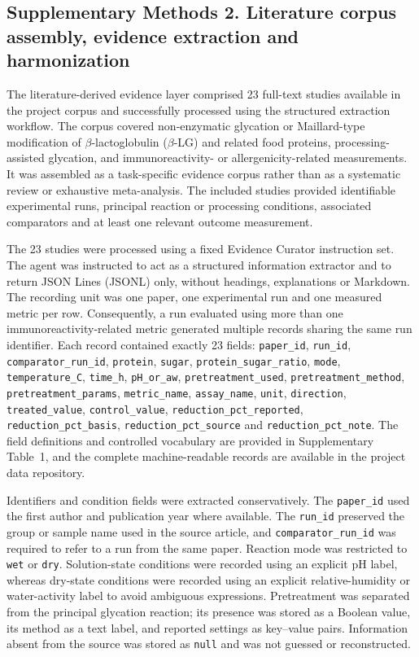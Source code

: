 \subsection*{Supplementary Methods 2. Literature corpus assembly, evidence extraction and harmonization}

The literature-derived evidence layer comprised 23 full-text studies available in
the project corpus and successfully processed using the structured extraction
workflow. The corpus covered non-enzymatic glycation or Maillard-type modification
of $\beta$-lactoglobulin ($\beta$-LG) and related food proteins,
processing-assisted glycation, and immunoreactivity- or allergenicity-related
measurements. It was assembled as a task-specific evidence corpus rather than as a
systematic review or exhaustive meta-analysis. The included studies provided
identifiable experimental runs, principal reaction or processing conditions,
associated comparators and at least one relevant outcome measurement.

The 23 studies were processed using a fixed Evidence Curator instruction
set. The agent was instructed to act as a structured information extractor and to
return JSON Lines (JSONL) only, without headings, explanations or Markdown. The
recording unit was one paper, one experimental run and one measured metric per row.
Consequently, a run evaluated using more than one immunoreactivity-related metric
generated multiple records sharing the same run identifier. Each record contained
exactly 23 fields: \texttt{paper\_id}, \texttt{run\_id},
\texttt{comparator\_run\_id}, \texttt{protein}, \texttt{sugar},
\texttt{protein\_sugar\_ratio}, \texttt{mode}, \texttt{temperature\_C},
\texttt{time\_h}, \texttt{pH\_or\_aw}, \texttt{pretreatment\_used},
\texttt{pretreatment\_method}, \texttt{pretreatment\_params},
\texttt{metric\_name}, \texttt{assay\_name}, \texttt{unit},
\texttt{direction}, \texttt{treated\_value}, \texttt{control\_value},
\texttt{reduction\_pct\_reported}, \texttt{reduction\_pct\_basis},
\texttt{reduction\_pct\_source} and \texttt{reduction\_pct\_note}. The field
definitions and controlled vocabulary are provided in Supplementary Table~1, and
the complete machine-readable records are available in the project data repository.

Identifiers and condition fields were extracted conservatively. The
\texttt{paper\_id} used the first author and publication year where available.
The \texttt{run\_id} preserved the group or sample name used in the source article,
and \texttt{comparator\_run\_id} was required to refer to a run from the same paper.
Reaction mode was restricted to \texttt{wet} or \texttt{dry}. Solution-state
conditions were recorded using an explicit pH label, whereas dry-state conditions
were recorded using an explicit relative-humidity or water-activity label to avoid
ambiguous expressions. Pretreatment was separated from the principal glycation
reaction; its presence was stored as a Boolean value, its method as a text label,
and reported settings as key--value pairs. Information absent from the source was
stored as \texttt{null} and was not guessed or reconstructed.


